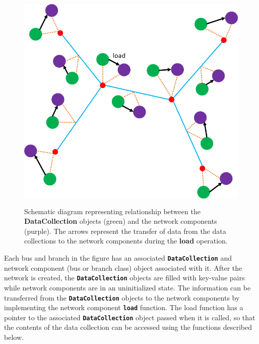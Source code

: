 \begin{figure}
  \centering
    \includegraphics*[width=6.00in, height=4.24in,
keepaspectratio=true]{figures/Network-objects}
  \caption{Schematic diagram representing relationship between the \textbf{DataCollection} objects (green) and the network components (purple). The arrows represent the transfer of data from the data collections to the network components during the \textbf{load} operation.}
  \label{fig:data-schematic}
\end{figure}



Each bus and branch in the figure has an associated \texttt{\textbf{DataCollection}} and network component (bus or branch class) object associated with it. After the network is created, the \texttt{\textbf{DataCollection}} objects are filled with key-value pairs while network components are in an uninitialized state. The information can be transferred from the \texttt{\textbf{DataCollection}} objects to the network components by implementing the network component \texttt{\textbf{load}} function. The load function has a pointer to the associated \texttt{\textbf{DataCollection}} object passed when it is called, so that the contents of the data collection can be accessed using the functions described below.

